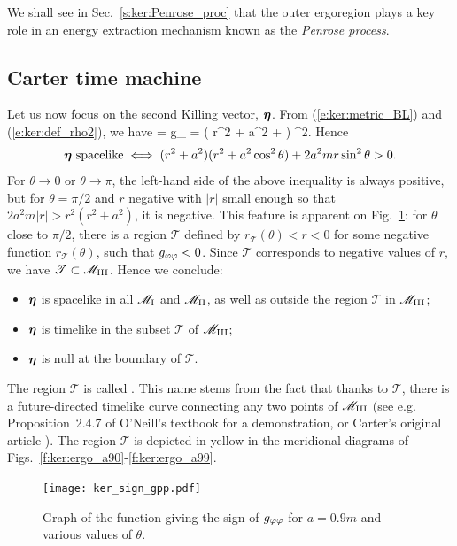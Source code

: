 We shall see in Sec.~\ref{s:ker:Penrose_proc} that the outer ergoregion
plays a key role in an energy extraction mechanism known as the
\emph{Penrose process}.

\subsection{Carter time machine} \label{s:ker:time_machine}

Let us now focus on the second Killing vector, $\bm{\eta}$.
From (\ref{e:ker:metric_BL}) and (\ref{e:ker:def_rho2}), we have
\be \label{e:ker:eta_square}
    \w{\eta}\cdot\w{\eta} = g_{\ph\ph} = \left( r^2 + a^2 +  \right) \sin^2\th .
\ee
Hence
\[
    \w{\eta}\ \mbox{spacelike} \iff
        (r^2 + a^2)(r^2 + a^2\cos^2\th) + 2 a^2 m r \sin^2\th > 0 .
\]
For $\theta\rightarrow 0$ or $\theta\rightarrow\pi$, the left-hand side of the above inequality
is always positive, but for $\theta=\pi/2$ and $r$ negative with $|r|$
small enough so that $2 a^2 m |r| > r^2(r^2 + a^2)$, it is negative. This feature
is apparent on Fig.~\ref{f:ker:sign_gpp}: for $\theta$ close to $\pi/2$,
there is a region $\mathscr{T}$ defined by $r_{\mathscr{T}}(\theta) < r < 0$ for some
negative function $r_{\mathscr{T}}(\theta)$, such that $g_{\varphi\varphi}<0$.
Since $\mathscr{T}$ corresponds to negative values of $r$, we have
$\mathscr{T}\subset \mathscr{M}_{\rm III}$.
Hence we conclude:
\begin{itemize}
\item $\bm{\eta}$ is spacelike in all $\mathscr{M}_{\rm I}$ and $\mathscr{M}_{\rm II}$, as well
as outside the region $\mathscr{T}$ in $\mathscr{M}_{\rm III}$;
\item $\bm{\eta}$ is timelike in the subset $\mathscr{T}$ of $\mathscr{M}_{\rm III}$;
\item $\bm{\eta}$ is null at the boundary of $\mathscr{T}$.
\end{itemize}
The region $\mathscr{T}$ is called
.
This name stems from the fact that thanks to $\mathscr{T}$, there is
a future-directed timelike curve connecting any two points of $\mathscr{M}_{\rm III}$
(see e.g. Proposition~2.4.7 of O'Neill's textbook \cite{ONeil95} for a
demonstration, or Carter's original article \cite{Carte68a}).
The region $\mathscr{T}$ is depicted in yellow in the meridional
diagrams of
Figs.~\ref{f:ker:ergo_a90}-\ref{f:ker:ergo_a99}.
\begin{figure}
\centerline{\texttt{[image: ker\_sign\_gpp.pdf]}}
\caption[]{\label{f:ker:sign_gpp} \footnotesize
Graph of the function giving the sign of $g_{\varphi\varphi}$ for $a=0.9m$
and various values of $\theta$.}
\end{figure}


